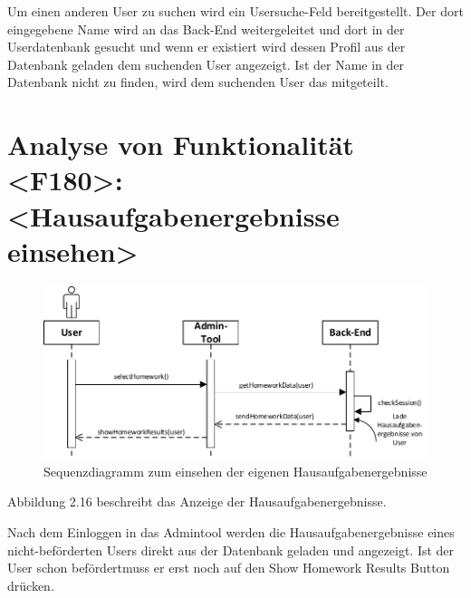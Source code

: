 Um einen anderen User zu suchen wird ein Usersuche-Feld bereitgestellt. Der dort eingegebene Name wird an das Back-End weitergeleitet und dort in der Userdatenbank gesucht und wenn er existiert wird dessen Profil aus der Datenbank geladen dem suchenden User angezeigt. Ist der Name in der Datenbank nicht zu finden, wird dem suchenden User das mitgeteilt.

\newpage
\section{Analyse von Funktionalität <F180>: <Hausaufgabenergebnisse einsehen>}
\begin{figure}[h]
\centering
\includegraphics[width=1.3\textwidth]{figures/sequenz_F180.pdf}
\caption{Sequenzdiagramm zum einsehen der eigenen Hausaufgabenergebnisse}
\label{sequence}
\end{figure}
Abbildung 2.16 beschreibt das Anzeige der Hausaufgabenergebnisse.

Nach dem Einloggen in das Admintool werden die Hausaufgabenergebnisse eines nicht-beförderten Users direkt aus der Datenbank geladen und angezeigt.
Ist der User schon \glqq befördert\grqq muss er erst noch auf den Show Homework Results Button drücken.

\newpage
